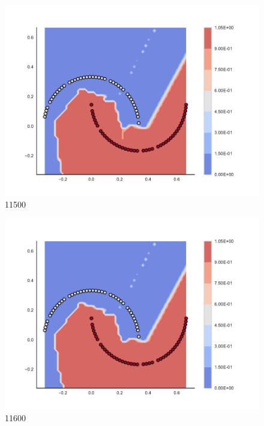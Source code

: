 \begin{subfigure}[b]{0.09\textwidth}
    \includegraphics[clip, trim=2.35cm 1.75cm 4.5cm 0cm,width=\textwidth]{img/convergence/11500.pdf}
    \caption{11500}
    \label{fig:convergence_11500}
\end{subfigure}
%
\begin{subfigure}[b]{0.09\textwidth}
    \includegraphics[clip, trim=2.35cm 1.75cm 4.5cm 0cm,width=\textwidth]{img/convergence/11600.pdf}
    \caption{11600}
    \label{fig:convergence_11600}
\end{subfigure}
%
